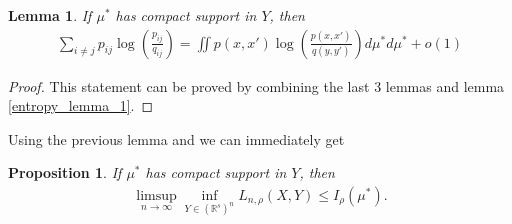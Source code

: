 \documentclass[10pt]{article}
\newtheorem{lemma}{\bf Lemma}
\newtheorem{proposition}{\bf Proposition}
\newenvironment{Proof of lemma}{\noindent{\bf Proof of Lemma}}{\hfill$\Box$\newline}
\newenvironment{Proof of claim}{\noindent{\bf Proof of claim}}{\hfill$\Box$\newline}
\newenvironment{Proof of theorem}{\noindent{\bf Proof of Theorem}}{\hfill\scriptsize{$\Box$}\newline}
\newenvironment{Proof of theorems}{\noindent{\bf Proof of Theorems}}{\hfill$\Box$\newline}
\newenvironment{Proof of proposition}{\noindent{\bf Proof of Proposition}}{\hfill$\Box$\newline}
\newenvironment{Proof of propositions}{\noindent{\bf Proof of Propositions}}{\hfill$\Box$\newline}
\newenvironment{Proof of exercise}{\noindent{\it Proof of Exercise:}}{\hfill$\Box$}
\numberwithin{equation}{section}
\begin{document}
\begin{lemma}
    If $\mu^*$ has compact support in $Y$, then
    \begin{align}
        \sum_{i \neq j} p_{ij} \log \left(\frac{p_{ij}}{q_{ij}}\right) = \iint p(x,x') \log\left(\frac{p(x,x')}{q(y,y')}\right) d\mu^* d\mu^* +o(1)
    \end{align}
\end{lemma}
\begin{proof}
    This statement can be proved by combining the last 3 lemmas and lemma \ref{entropy_lemma_1}.
\end{proof}
Using the previous lemma and we can immediately get
\begin{proposition} \label{upper_bound_prop}
    If $\mu^*$ has compact support in $Y$, then
    \begin{align}
        \limsup_{n \to \infty} \inf_{Y \in (\mathbb{R}^s)^n} L_{n,\rho}(X,Y) \leq I_{\rho}(\mu^*).
    \end{align}
\end{proposition}
\end{document}
